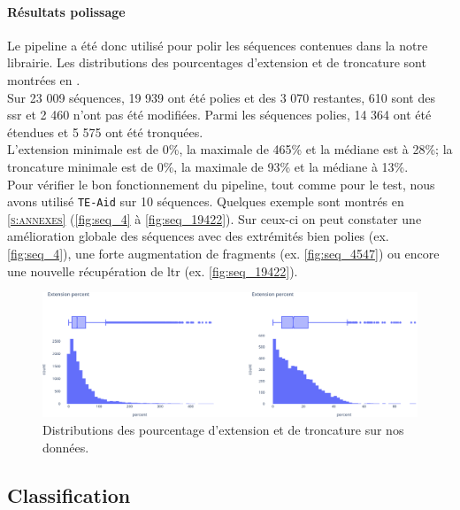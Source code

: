 \documentclass[10pt]{article}
\begin{document}
\bigskip

\paragraph{Résultats polissage} Le pipeline a été donc utilisé pour polir les séquences contenues dans la notre librairie. Les distributions des pourcentages d'extension et de troncature sont montrées en \figureautorefname{ \ref{fig:polishte_put_data}}. \\
Sur 23 009 séquences, 19 939 ont été polies et des 3 070 restantes, 610 sont des \acrshort{ssr} et 2 460 n'ont pas été modifiées. Parmi les séquences polies, 14 364 ont été étendues et 5 575 ont été tronquées. \\
L'extension minimale est de 0\%, la maximale de 465\% et la médiane est à 28\%; la troncature minimale est de 0\%, la maximale de 93\% et la médiane à 13\%. \\
Pour vérifier le bon fonctionnement du pipeline, tout comme pour le test, nous avons utilisé \texttt{TE-Aid} sur 10 séquences. Quelques exemple sont montrés en \textsc{\ref{s:annexes}} (\autoref{fig:seq_4} à \autoref{fig:seq_19422}). Sur ceux-ci on peut constater une amélioration globale des séquences avec des extrémités bien polies (ex. \autoref{fig:seq_4}), une forte augmentation de fragments (ex. \autoref{fig:seq_4547}) ou encore une nouvelle récupération de \acrshort{ltr} (ex. \autoref{fig:seq_19422}). \\

\begin{figure}[H]
    \centering
    \includegraphics[width=\textwidth]{img/plots/polish_putative_data.eps}
    \caption{Distributions des pourcentage d'extension et de troncature sur nos données.}
    \label{fig:polishte_put_data}
\end{figure}

\bigskip

\subsection{Classification}
\end{document}
